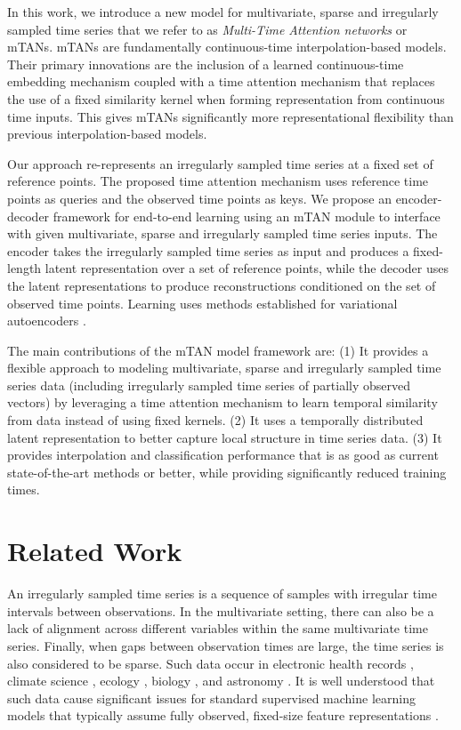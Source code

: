 \documentclass{article} \usepackage{iclr2021_conference,times}
\newcommand{\acro}{{mTAN}}
\begin{document}
In this work, we introduce a new model for multivariate, sparse and irregularly sampled time series that we refer to as \textit{Multi-Time Attention networks} or {\acro}s. {\acro}s are fundamentally continuous-time interpolation-based models. Their primary innovations are the inclusion of a learned continuous-time embedding mechanism coupled with a time attention mechanism that replaces the use of a fixed similarity kernel when forming representation from continuous time inputs. This gives {\acro}s significantly more representational flexibility than previous interpolation-based models.  

Our approach re-represents an irregularly sampled time series at a fixed set of reference points. The proposed time attention mechanism uses reference time points as queries and the observed time points as keys. We propose an encoder-decoder framework for end-to-end learning using an {\acro} module to interface with given  multivariate, sparse and irregularly sampled time series inputs. The encoder takes the irregularly sampled time series as input and produces a fixed-length latent representation over a set of reference points, while the decoder uses the latent representations to produce reconstructions conditioned on the set of observed time points. Learning uses methods established for variational autoencoders \citep{rezende14, kingma13}.

The main contributions of the mTAN model framework are:
(1) It provides a flexible approach to modeling multivariate, sparse and irregularly sampled time series data (including irregularly sampled time series of partially observed vectors) by leveraging 
a time attention mechanism to learn temporal similarity from data instead of using fixed kernels. 
(2) It uses a temporally distributed latent representation to better capture local structure in time series data.
(3) It provides interpolation and classification performance that is as good as current state-of-the-art methods or better, while providing significantly reduced training times.





 \section{Related Work}

An irregularly sampled time series is a sequence of samples with irregular time intervals between observations. 
In the multivariate setting, there can also be a lack of alignment across different variables within the same multivariate time series. Finally, when gaps between observation times are large, the time series is also considered to be sparse. Such data occur in electronic health records \citep{yadav2018mining}, climate science \citep{schulz1997spectrum},
ecology \citep{clark2004population},
biology \citep{ruf1999lomb},
and astronomy \citep{scargle-astro1982}. It is well understood that such data cause significant issues for standard 
supervised machine learning models that typically assume 
fully observed, fixed-size feature representations \citep{yadav2018mining}.
\end{document}
